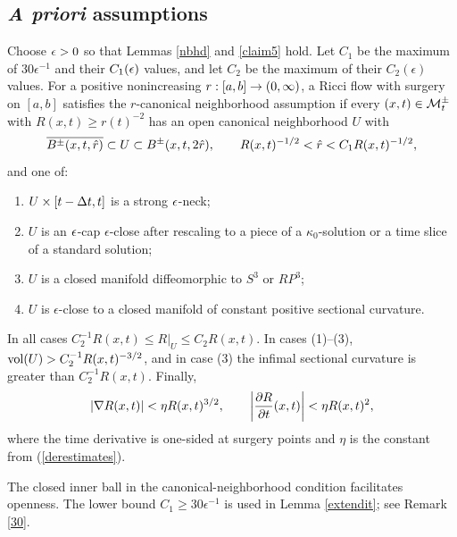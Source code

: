 \subsection{\emph{A priori} assumptions}

\begin{definition}
  \label{def:kl-priori-assumptions-canonical-neighborhood-assumption}
\label{canonicalnbhddef}
Choose $\epsilon>0$ so that Lemmas \ref{nbhd} and \ref{claim5} hold. Let
$C_1$ be the maximum of $30\epsilon^{-1}$ and their $C_1(\epsilon)$ values, and
let $C_2$ be the maximum of their $C_2(\epsilon)$ values. For a positive
nonincreasing $r:[a,b]\rightarrow(0,\infty)$, a Ricci flow with surgery on $[a,b]$
satisfies the $r$-canonical neighborhood assumption if every
$(x,t)\in{\mathcal M}_t^\pm$ with $R(x,t)\geq r(t)^{-2}$ has an open canonical
neighborhood $U$ with
\[
\overline{B^\pm(x,t,\hat r)}\subset U\subset B^\pm(x,t,2\hat r),\qquad
R(x,t)^{-1/2}<\hat r<C_1R(x,t)^{-1/2},
\]
and one of:
\begin{enumerate}
\item $U\times[t-\Delta t,t]$ is a strong $\epsilon$-neck;
\item $U$ is an $\epsilon$-cap $\epsilon$-close after rescaling to a piece of a
$\kappa_0$-solution or a time slice of a standard solution;
\item $U$ is a closed manifold diffeomorphic to $S^3$ or $RP^3$;
\item $U$ is $\epsilon$-close to a closed manifold of constant positive
sectional curvature.
\end{enumerate}
In all cases $C_2^{-1}R(x,t)\leq R|_U\leq C_2R(x,t)$. In cases (1)--(3),
$\operatorname{vol}(U)>C_2^{-1}R(x,t)^{-3/2}$, and in case (3) the infimal sectional
curvature is greater than $C_2^{-1}R(x,t)$. Finally,
\begin{equation}
\label{II.(1.3)estimates}
|\nabla R(x,t)|<\eta R(x,t)^{3/2},\qquad
\left|\frac{\partial R}{\partial t}(x,t)\right|<\eta R(x,t)^2,
\end{equation}
where the time derivative is one-sided at surgery points and $\eta$ is the
constant from (\ref{derestimates}).
\end{definition}

\begin{remark}
  \label{rem:kl-priori-assumptions-continuation-canonical-neighborhoods}
The closed inner ball in the canonical-neighborhood condition facilitates
openness. The lower bound $C_1\geq30\epsilon^{-1}$ is used in Lemma
\ref{extendit}; see Remark \ref{30}.
\end{remark}

